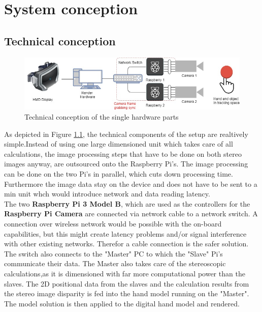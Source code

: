 \chapter{System conception}\section{Technical conception}
\begin{figure}[H]
\includegraphics[width=\textwidth]{images/technical_setup.jpg}
\caption{Technical conception of the single hardware parts}
\label{fig:technical-copnception}
\end{figure} 
As depicted in Figure \ref{fig:technical-copnception}, the technical components of the setup are realtively simple.Instead of using one large dimensioned unit which takes care of all calculations, the image processing steps that have to be done on both stereo images anyway, are outsourced onto the Raspberry Pi's.
The image processing can be done on the two Pi's in parallel, which cuts down processing time. Furthermore the image data stay on the device and does not have to be sent to a min unit whch would introduce network and data reading latency.\\
The two \textbf{Raspberry Pi 3 Model B}, which are used as the controllers for the \textbf{Raspberry Pi Camera} are connected via network cable to a network switch. A connection over wireless network would be possible with the on-board capabilities, but this might create latency problems and/or signal interference with other existing networks. Therefor a cable connection is the safer solution.
The switch also connects to the "Master" PC to which the "Slave" Pi's communicate their data. The Master also takes care of the stereoscopic calculations,as it is dimensioned with far more computational power than the slaves. The 2D positional data from the slaves and the calculation results from the stereo image disparity is fed into the hand model running on the "Master". The model solution is then applied to the digital hand model and rendered.
\newpage
